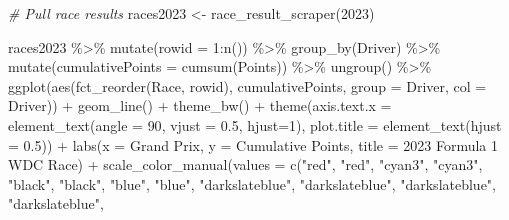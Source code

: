 \documentclass[
]{book}
\newenvironment{Shaded}{\begin{snugshade}}{\end{snugshade}}
\newcommand{\AttributeTok}[1]{\textcolor[rgb]{0.77,0.63,0.00}{#1}}
\newcommand{\CommentTok}[1]{\textcolor[rgb]{0.56,0.35,0.01}{\textit{#1}}}
\newcommand{\DecValTok}[1]{\textcolor[rgb]{0.00,0.00,0.81}{#1}}
\newcommand{\FloatTok}[1]{\textcolor[rgb]{0.00,0.00,0.81}{#1}}
\newcommand{\FunctionTok}[1]{\textcolor[rgb]{0.00,0.00,0.00}{#1}}
\newcommand{\NormalTok}[1]{#1}
\newcommand{\OtherTok}[1]{\textcolor[rgb]{0.56,0.35,0.01}{#1}}
\newcommand{\SpecialCharTok}[1]{\textcolor[rgb]{0.00,0.00,0.00}{#1}}
\newcommand{\StringTok}[1]{\textcolor[rgb]{0.31,0.60,0.02}{#1}}
\begin{document}
\begin{Shaded}
\begin{Highlighting}[]
\CommentTok{\# Pull race results}
\NormalTok{races2023 }\OtherTok{\textless{}{-}} \FunctionTok{race\_result\_scraper}\NormalTok{(}\DecValTok{2023}\NormalTok{)}

\NormalTok{races2023 }\SpecialCharTok{\%\textgreater{}\%}
  \FunctionTok{mutate}\NormalTok{(}\AttributeTok{rowid =} \DecValTok{1}\SpecialCharTok{:}\FunctionTok{n}\NormalTok{()) }\SpecialCharTok{\%\textgreater{}\%}
  \FunctionTok{group\_by}\NormalTok{(Driver) }\SpecialCharTok{\%\textgreater{}\%} 
  \FunctionTok{mutate}\NormalTok{(}\AttributeTok{cumulativePoints =} \FunctionTok{cumsum}\NormalTok{(Points)) }\SpecialCharTok{\%\textgreater{}\%}
  \FunctionTok{ungroup}\NormalTok{() }\SpecialCharTok{\%\textgreater{}\%} 
  \FunctionTok{ggplot}\NormalTok{(}\FunctionTok{aes}\NormalTok{(}\FunctionTok{fct\_reorder}\NormalTok{(Race, rowid), cumulativePoints,}
         \AttributeTok{group =}\NormalTok{ Driver, }\AttributeTok{col =}\NormalTok{ Driver)) }\SpecialCharTok{+}
  \FunctionTok{geom\_line}\NormalTok{() }\SpecialCharTok{+}
  \FunctionTok{theme\_bw}\NormalTok{() }\SpecialCharTok{+} 
  \FunctionTok{theme}\NormalTok{(}\AttributeTok{axis.text.x =} \FunctionTok{element\_text}\NormalTok{(}\AttributeTok{angle =} \DecValTok{90}\NormalTok{, }\AttributeTok{vjust =} \FloatTok{0.5}\NormalTok{, }\AttributeTok{hjust=}\DecValTok{1}\NormalTok{),}
        \AttributeTok{plot.title =} \FunctionTok{element\_text}\NormalTok{(}\AttributeTok{hjust =} \FloatTok{0.5}\NormalTok{)) }\SpecialCharTok{+}
  \FunctionTok{labs}\NormalTok{(}\AttributeTok{x =} \StringTok{\textquotesingle{}Grand Prix\textquotesingle{}}\NormalTok{,}
       \AttributeTok{y =} \StringTok{\textquotesingle{}Cumulative Points\textquotesingle{}}\NormalTok{,}
       \AttributeTok{title =} \StringTok{\textquotesingle{}2023 Formula 1 WDC Race\textquotesingle{}}\NormalTok{) }\SpecialCharTok{+}
  \FunctionTok{scale\_color\_manual}\NormalTok{(}\AttributeTok{values =} \FunctionTok{c}\NormalTok{(}\StringTok{"red"}\NormalTok{, }\StringTok{"red"}\NormalTok{, }
                                \StringTok{"cyan3"}\NormalTok{, }\StringTok{"cyan3"}\NormalTok{, }
                                \StringTok{"black"}\NormalTok{, }\StringTok{"black"}\NormalTok{,}
                                \StringTok{"blue"}\NormalTok{, }\StringTok{"blue"}\NormalTok{,}
                                \StringTok{"darkslateblue"}\NormalTok{, }\StringTok{"darkslateblue"}\NormalTok{,}
                                \StringTok{"darkslateblue"}\NormalTok{, }\StringTok{"darkslateblue"}\NormalTok{,}

\end{Highlighting}
\end{Shaded}
\end{document}
